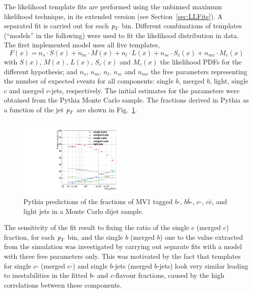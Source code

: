 The likelihood template fits are performed using the unbinned maximum likelihood technique, in its extended version (see Section~\ref{sec:LLFits}). A separated fit is carried out for each ${\emph{p}_{T}}$ bin. Different combinations of templates (``models'' in the following) were used to fit the likelihood distribution in data. The first implemented model uses all five templates,
%
\begin{equation}
F(x) = n_s \cdot S(x) + n_m \cdot M(x) + n_l \cdot L(x) + n_{sc} \cdot S_c(x) + n_{mc} \cdot M_c(x)
\end{equation}
%
with $S(x)$, $M(x)$, $L(x)$, $S_c(x)$ and $M_c(x)$ the likelihood PDFs for the different hypothesis; and $n_s$, $n_m$, $n_l$, $n_{sc}$ and $n_{mc}$ the free parameters representing the number of expected events for all components: single $b$, merged $b$, light, single $c$ and merged $c$-jets, respectively.  The initial estimates for the parameters were obtained from the {\sc Pythia} Monte Carlo sample. The fractions derived in {\sc Pythia}  as a function of the jet ${\emph{p}_{T}}$ are shown in Fig.~\ref{fig:truefractions}.


\begin{figure}[tp]
\centering
\includegraphics[width=0.50\textwidth]{TrueFractions_NominalPythia.pdf}
\caption{Pythia predictions of the fractions of MV1 tagged $b$-, $b\bar{b}$-, $c$-, $c\bar{c}$, and light jets in a Monte Carlo dijet sample.}
\label{fig:truefractions}
\end{figure}


The sensitivity of the fit result to fixing the ratio of the single $c$ (merged $c$) fraction, for each ${\emph{p}_{T}}$ bin, and the single $b$ (merged $b$)  one to the value extracted from the simulation was investigated by carrying out separate fits with a model with three free parameters only. This was motivated by the fact that templates for single $c$- (merged $c$-)  and single $b$-jets (merged $b$-jets) look very similar leading to inestabilities in the fitted $b$- and $c$-flavour fractions, caused by the high correlations between these components. 


